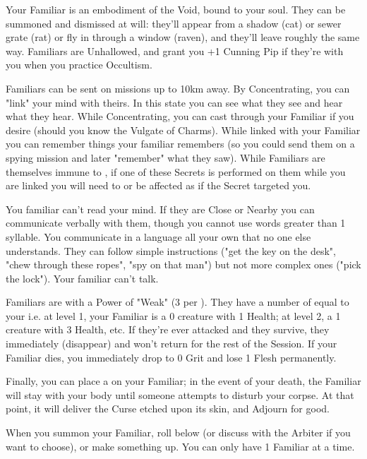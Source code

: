 Your Familiar is an embodiment of the Void, bound to your soul.  They can be summoned and dismissed at will: they'll appear from a shadow (cat) or sewer grate (rat) or fly in through a window (raven), and they'll leave roughly the same way.  Familiars are Unhallowed, and grant you +1 Cunning Pip if they're with you when you practice Occultism.

Familiars can be sent on missions up to 10km away. By Concentrating, you can "link" your mind with theirs. In this state you can see what they see and hear what they hear.  While Concentrating, you can cast  through your Familiar if you desire (should you know the Vulgate of Charms). While linked with your Familiar you can remember things your familiar remembers (so you could send them on a spying mission and later "remember" what they saw). While Familiars are themselves immune to , if one of these Secrets is performed on them while you are linked you will need to  or be affected as if the Secret targeted you. 

You familiar can't read your mind. If they are Close or Nearby you can communicate verbally with them, though you cannot use words greater than 1 syllable.  You communicate in a language all your own that no one else understands.  They can follow simple instructions ("get the key on the desk", "chew through these ropes", "spy on that man") but not more complex ones ("pick the lock").  Your familiar can't talk. 

Familiars are  with a Power of "Weak" (3  per \HD). They have a number of \HD equal to your  i.e. at level 1, your Familiar is a 0 \HD creature with 1 Health; at level 2, a 1 \HD creature with 3 Health, etc. If they're ever attacked and they survive, they immediately  (disappear) and won't return for the rest of the Session. If your Familiar dies, you immediately drop to 0 Grit and lose 1 Flesh permanently.


Finally, you can place a  on your Familiar; in the event of your death, the Familiar will stay with your body until someone attempts to disturb your corpse.  At that point, it will deliver the Curse etched upon its skin, and Adjourn for good.

When you summon your Familiar, roll below (or discuss with the Arbiter if you want to choose), or make something up.  You can only have 1 Familiar at a time.




